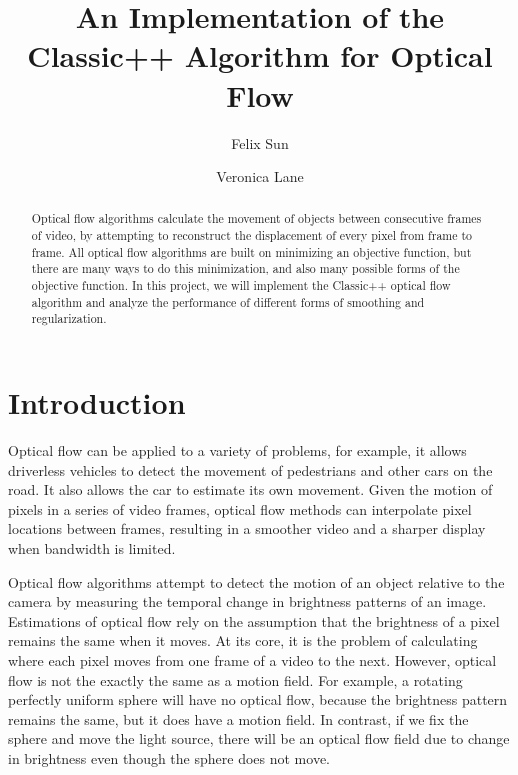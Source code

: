 \documentclass[10pt,twocolumn,letterpaper]{article}
\begin{document}
\title{An Implementation of the Classic++ Algorithm for Optical Flow}

\author{Felix Sun
\and
Veronica Lane
}

\maketitle
\begin{abstract}
Optical flow algorithms calculate the movement of objects between consecutive frames of video, by attempting to reconstruct the displacement of every pixel from frame to frame. All optical flow algorithms are built on minimizing an objective function, but there are many ways to do this minimization, and also many possible forms of the objective function. In this project, we will implement the Classic++ optical flow algorithm and analyze the performance of different forms of smoothing and regularization.
\end{abstract}


\section{Introduction}

Optical flow can be applied to a variety of problems, for example, it allows driverless vehicles to detect the movement of pedestrians and other cars on the road. It also allows the car to estimate its own movement. Given the motion of pixels in a series of video frames, optical flow methods can interpolate pixel locations between frames, resulting in a smoother video and a sharper display when bandwidth is limited.

Optical flow algorithms attempt to detect the motion of an object relative to the camera by measuring the temporal change in brightness patterns of an image. Estimations of optical flow rely on the assumption that the brightness of a pixel remains the same when it moves.
At its core, it is the problem of calculating where each pixel moves from one frame of a video to the next. \cite{fleet} However, optical flow is not the exactly the same as a motion field. For example, a rotating perfectly uniform sphere will have no optical flow, because the brightness pattern remains the same, but it does have a motion field. In contrast, if we fix the sphere and move the light source, there will be an optical flow field due to change in brightness even though the sphere does not move.
\end{document}
